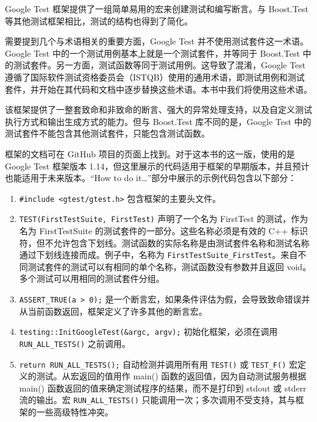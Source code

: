 
Google Test 框架提供了一组简单易用的宏来创建测试和编写断言。与 Boost.Test 等其他测试框架相比，测试的结构也得到了简化。

\begin{myNotic}
需要提到几个与术语相关的重要方面，Google Test 并不使用测试套件这一术语。Google Test 中的一个测试用例基本上就是一个测试套件，并等同于 Boost.Test 中的测试套件。另一方面，测试函数等同于测试用例。这导致了混淆，Google Test 遵循了国际软件测试资格委员会（ISTQB）使用的通用术语，即测试用例和测试套件，并开始在其代码和文档中逐步替换这些术语。本书中我们将使用这些术语。
\end{myNotic}

该框架提供了一整套致命和非致命的断言、强大的异常处理支持，以及自定义测试执行方式和输出生成方式的能力。但与 Boost.Test 库不同的是，Google Test 中的测试套件不能包含其他测试套件，只能包含测试函数。

框架的文档可在 GitHub 项目的页面上找到。对于这本书的这一版，使用的是 Google Test 框架版本 1.14，但这里展示的代码适用于框架的早期版本，并且预计也能适用于未来版本。“How to do it…”部分中展示的示例代码包含以下部分：

\begin{enumerate}
\item
\verb|#include <gtest/gtest.h>| 包含框架的主要头文件。

\item
\verb|TEST(FirstTestSuite, FirstTest)| 声明了一个名为 FirstTest 的测试，作为名为 FirstTestSuite 的测试套件的一部分。这些名称必须是有效的 C++ 标识符，但不允许包含下划线。测试函数的实际名称是由测试套件名称和测试名称通过下划线连接而成。例子中，名称为 \verb|FirstTestSuite_FirstTest|。来自不同测试套件的测试可以有相同的单个名称，测试函数没有参数并且返回 void。多个测试可以用相同的测试套件分组。

\item
\verb|ASSERT_TRUE(a > 0);| 是一个断言宏，如果条件评估为假，会导致致命错误并从当前函数返回，框架定义了许多其他的断言宏。

\item
\verb|testing::InitGoogleTest(&argc, argv);| 初始化框架，必须在调用 \verb|RUN_ALL_TESTS()| 之前调用。

\item
\verb|return RUN_ALL_TESTS();| 自动检测并调用所有用 \verb|TEST()| 或 \verb|TEST_F()| 宏定义的测试。从宏返回的值用作 main() 函数的返回值，因为自动测试服务根据 main() 函数返回的值来确定测试程序的结果，而不是打印到 stdout 或 stderr 流的输出。宏 \verb|RUN_ALL_TESTS()| 只能调用一次；多次调用不受支持，其与框架的一些高级特性冲突。
\end{enumerate}

